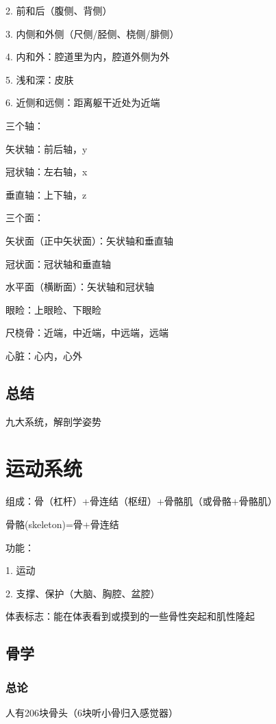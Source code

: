 2. 前和后（腹侧、背侧）

3. 内侧和外侧（尺侧/胫侧、桡侧/腓侧）

4. 内和外：腔道里为内，腔道外侧为外

5. 浅和深：皮肤

6. 近侧和远侧：距离躯干近处为近端
\begin{notation}
    三个轴：

    矢状轴：前后轴，y

    冠状轴：左右轴，x

    垂直轴：上下轴，z

    三个面：

    矢状面（正中矢状面）：矢状轴和垂直轴

    冠状面：冠状轴和垂直轴

    水平面（横断面）：矢状轴和冠状轴
\end{notation}
\begin{eg}
    眼睑：上眼睑、下眼睑

    尺桡骨：近端，中近端，中远端，远端

    心脏：心内，心外
\end{eg}
\subsection{总结}%
\label{sub:总结}
九大系统，解剖学姿势

\section{运动系统}%
\label{sec:运动系统}
组成：骨（杠杆）+骨连结（枢纽）+骨骼肌（或骨骼+骨骼肌）

骨骼(skeleton)=骨+骨连结

\begin{notation}
    功能：

    1. 运动

    2. 支撑、保护（大脑、胸腔、盆腔）
\end{notation}
\begin{notation}
    体表标志：能在体表看到或摸到的一些骨性突起和肌性隆起
\end{notation}

\subsection{骨学}%
\label{sub:骨学}
\subsubsection{总论}%
\label{subsub:总论}
人有206块骨头（6块听小骨归入感觉器）

